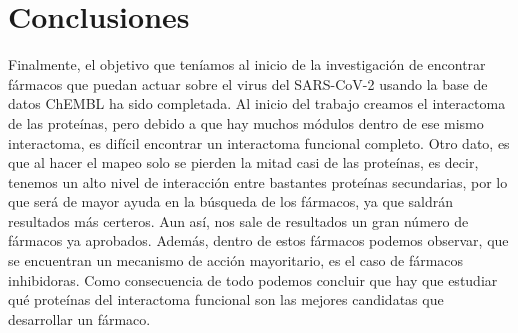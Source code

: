 \section{Conclusiones}
Finalmente, el objetivo que teníamos al inicio de la investigación de encontrar fármacos que puedan actuar sobre el virus del SARS-CoV-2 usando la base de datos ChEMBL ha sido completada. Al inicio del trabajo creamos el interactoma de las proteínas, pero debido a que hay muchos módulos dentro de ese mismo interactoma, es difícil encontrar un interactoma funcional completo. Otro dato, es que al hacer el mapeo solo se pierden la mitad casi de las proteínas, es decir, tenemos un alto nivel de interacción entre bastantes proteínas secundarias, por lo que será de mayor ayuda en la búsqueda de los fármacos, ya que saldrán resultados más certeros. Aun así, nos sale de resultados un gran número de fármacos ya aprobados. Además, dentro de estos fármacos podemos observar, que se encuentran un mecanismo de acción mayoritario, es el caso de fármacos inhibidoras. Como consecuencia de todo podemos concluir que hay que estudiar qué proteínas del interactoma funcional son las mejores candidatas que desarrollar un fármaco.  
